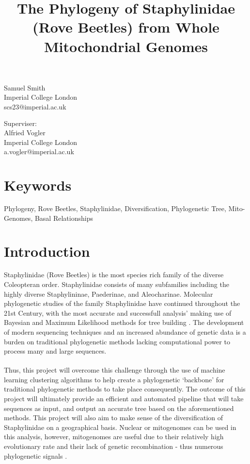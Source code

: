 \documentclass[12pt]{article}
\title{The Phylogeny of Staphylinidae (Rove Beetles) from Whole Mitochondrial Genomes}
\begin{document}
\singlespacing
\begin{titlepage}
    \maketitle
    \begin{center}
        Samuel Smith \\ Imperial College London \\ scs23@imperial.ac.uk
    \end{center}
    \begin{center}
        Superviser: \\ Alfried Vogler \\ Imperial College London \\ a.vogler@imperial.ac.uk
    \end{center}
\end{titlepage}


    \section{Keywords}
    Phylogeny, Rove Beetles, Staphylinidae, Diversification, Phylogenetic Tree, Mito-Genomes, Basal Relationships
    \section{Introduction}
    Staphylinidae (Rove Beetles) is the most species rich family of the diverse Coleopteran order. Staphylinidae consists of many subfamilies including the highly diverse Staphylininae, Paederinae, and Aleocharinae. Molecular phylogenetic studies of the family Staphylinidae have continued throughout the 21st Century, with the most accurate and successfull analysis' making use of Bayesian and Maximum Likelihood methods for tree building \cite{Gusarov2018}. The development of modern sequencing techniques and an increased abundance of genetic data is a burden on traditional phylogenetic methods lacking computational power to process many and large sequences.\\ \\
    Thus, this project will overcome this challenge through the use of machine learning clustering algorithms to help create a phylogenetic `backbone' for traditional phylogenetic methods to take place consequently. The outcome of this project will ultimately provide an efficient and automated pipeline that will take sequences as input, and output an accurate tree based on the aforementioned methods. This project will also aim to make sense of the diversification of Staphylinidae on a geographical basis. Nuclear or mitogenomes can be used in this analysis, however, mitogenomes are useful due to their relatively high evolutionary rate and their lack of genetic recombination - thus numerous phylogenetic signals \cite{Lu2022}. 
\end{document}
